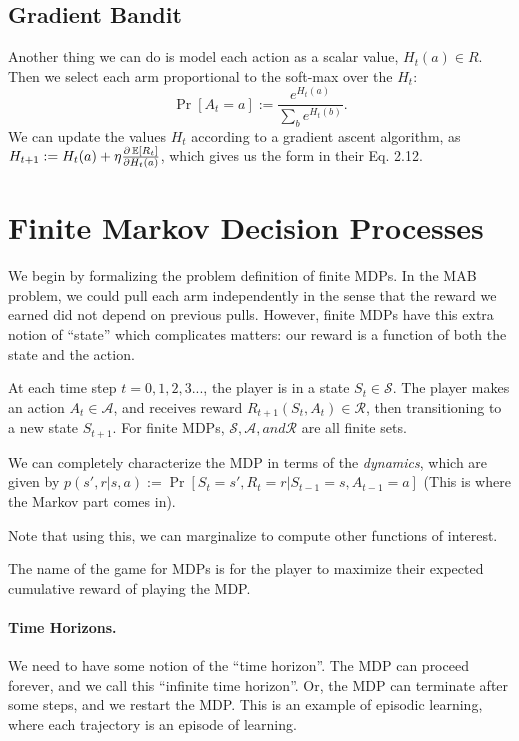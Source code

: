 \documentclass{article}
\begin{document}
\subsection{Gradient Bandit}
Another thing we can do is model each action as a scalar value, $H_t(a) \in R$. Then we select each arm proportional to the soft-max over the $H_t$:
\begin{equation}
    \Pr[A_t = a] := \frac{e^{H_t(a)}}{\sum_b e^{H_t(b)}}.
\end{equation}
We can update the values $H_t$ according to a gradient ascent algorithm, as $H_{t+1} := H_t(a) + \eta \frac{\partial \operatorname*{\mathbb{E}}[R_t]}{\partial H_t(a)}$, which gives us the form in their Eq. 2.12.

\section{Finite Markov Decision Processes}

We begin by formalizing the problem definition of finite MDPs. In the MAB problem, we could pull each arm independently in the sense that the reward we earned did not depend on previous pulls. However, finite MDPs have this extra notion of ``state'' which complicates matters: our reward is a function of both the state and the action.

\begin{definition}
At each time step $t = 0,1,2,3...$, the player is in a state $S_t \in \mathcal{S}$. The player makes an action $A_t \in \mathcal{A}$, and receives reward $R_{t+1}(S_t, A_t) \in \mathcal{R}$, then transitioning to a new state $S_{t+1}$. For finite MDPs, $\mathcal{S}, \mathcal{A}, and \mathcal{R}$ are all finite sets.

We can completely characterize the MDP in terms of the \emph{dynamics}, which are given by $p(s', r|s,a) := \Pr [S_t = s', R_t = r | S_{t-1}=s, A_{t-1}=a]$ (This is where the Markov part comes in).

Note that using this, we can marginalize to compute other functions of interest.

\end{definition}

The name of the game for MDPs is for the player to maximize their expected cumulative reward of playing the MDP.

\paragraph{Time Horizons.} We need to have some notion of the ``time horizon''. The MDP can proceed forever, and we call this ``infinite time horizon''. Or, the MDP can terminate after some steps, and we restart the MDP. This is an example of episodic learning, where each trajectory is an episode of learning.
\end{document}
